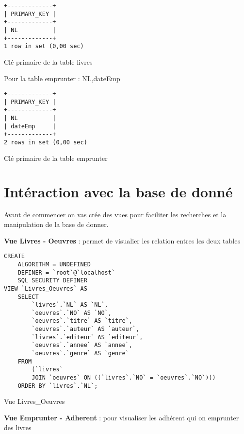 \documentclass{article}
\begin{document}
\begin{listing}[H]
	\begin{verbatim}
+-------------+
| PRIMARY_KEY |
+-------------+
| NL          |
+-------------+
1 row in set (0,00 sec)
\end{verbatim}
	\caption{Clé primaire de la table livres}
\end{listing}

Pour la table emprunter : NL,dateEmp

\begin{listing}[H]
	\begin{verbatim}
+-------------+
| PRIMARY_KEY |
+-------------+
| NL          |
| dateEmp     |
+-------------+
2 rows in set (0,00 sec)
\end{verbatim}
	\caption{Clé primaire de la table emprunter}

\end{listing}
\newpage
\section{Intéraction avec la base de donné}

Avant de commencer on vas crée des vues pour faciliter les recherches et la manipulation de la base de donner.


\textbf{Vue Livres - Oeuvres} : permet de visualier les relation entres les deux tables
\begin{listing}[H]
	\begin{verbatim}
CREATE 
	ALGORITHM = UNDEFINED 
	DEFINER = `root`@`localhost` 
	SQL SECURITY DEFINER
VIEW `Livres_Oeuvres` AS
	SELECT 
		`livres`.`NL` AS `NL`,
		`oeuvres`.`NO` AS `NO`,
		`oeuvres`.`titre` AS `titre`,
		`oeuvres`.`auteur` AS `auteur`,
		`livres`.`editeur` AS `editeur`,
		`oeuvres`.`annee` AS `annee`,
		`oeuvres`.`genre` AS `genre`
	FROM
		(`livres`
		JOIN `oeuvres` ON ((`livres`.`NO` = `oeuvres`.`NO`)))
	ORDER BY `livres`.`NL`;
\end{verbatim}
	\caption{Vue Livres\_Oeuvres}
\end{listing}
\textbf{Vue Emprunter - Adherent } : pour visualiser les adhérent qui on emprunter des livres
\end{document}
